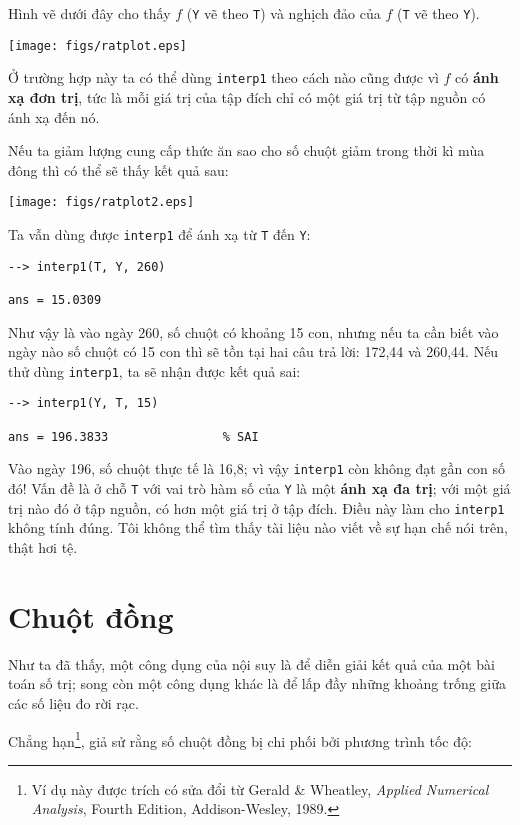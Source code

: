 \documentclass[12pt]{book}
\begin{document}
Hình vẽ dưới đây cho thấy $f$ ({\tt Y} vẽ theo  {\tt T}) và nghịch đảo 
của  $f$ ({\tt T} vẽ theo {\tt Y}).

\centerline{\texttt{[image: figs/ratplot.eps]}}

Ở trường hợp này ta có thể dùng  {\tt interp1} theo cách nào cũng được 
vì  $f$ có  {\bf ánh xạ đơn trị}, tức là mỗi giá trị của tập đích chỉ có một 
giá trị từ tập nguồn có ánh xạ đến nó.

Nếu ta giảm lượng cung cấp thức ăn sao cho số chuột giảm trong thời kì 
mùa đông thì có thể sẽ thấy kết quả sau:

\centerline{\texttt{[image: figs/ratplot2.eps]}}

Ta vẫn dùng được  {\tt interp1} để ánh xạ từ  {\tt T} đến  {\tt Y}:

\begin{verbatim}
--> interp1(T, Y, 260)

ans = 15.0309   
\end{verbatim}
%
Như vậy là vào ngày 260, số chuột có khoảng 15 con, nhưng nếu ta cần biết 
vào ngày nào số chuột có 15 con thì sẽ tồn tại hai câu trả lời: 172,44 và 
260,44.  Nếu thử dùng  {\tt interp1}, ta sẽ nhận được kết quả sai:

\begin{verbatim}
--> interp1(Y, T, 15)         

ans = 196.3833                % SAI 
\end{verbatim}
%
Vào ngày 196, số chuột thực tế là 16,8; vì vậy  {\tt interp1} còn không đạt 
gần con số đó! Vấn đề là ở chỗ {\tt T} với vai trò hàm số của {\tt Y} là một 
{\bf ánh xạ đa trị}; với một giá trị nào đó ở tập nguồn, có hơn một giá trị ở 
tập đích. Điều này làm cho {\tt interp1} không tính đúng. Tôi không thể tìm thấy 
tài liệu nào viết về sự hạn chế nói trên, thật hơi tệ.


\section{Chuột đồng}

Như ta đã thấy, một công dụng của nội suy là để diễn giải kết quả của một 
bài toán số trị; song còn một công dụng khác là để lấp đầy những khoảng 
trống giữa các số liệu đo rời rạc.

Chẳng hạn\footnote{Ví dụ này được trích có sửa đổi từ Gerald \& Wheatley,
{\em Applied Numerical Analysis}, Fourth Edition, Addison-Wesley,
1989.}, giả sử rằng số chuột đồng bị chi phối bởi phương trình tốc độ:
\end{document}
